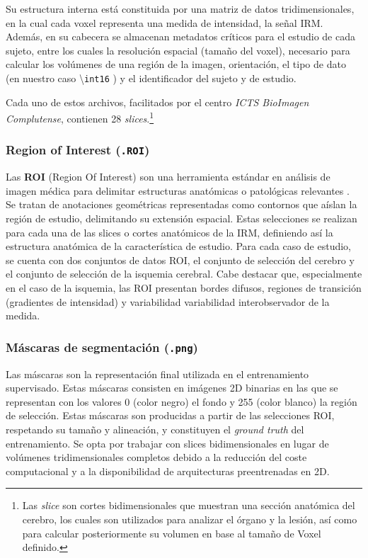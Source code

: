 Su estructura interna está constituida por una matriz de datos tridimensionales, en la cual cada voxel representa una medida de intensidad, la señal IRM. Además, en su cabecera se almacenan metadatos críticos para el estudio de cada sujeto, entre los cuales la resolución espacial (tamaño del voxel), necesario para calcular los volúmenes de una región de la imagen, orientación, el tipo de dato (en nuestro caso \textbackslash{\texttt{int16} )}
y el identificador del sujeto y de estudio.

Cada uno de estos archivos, facilitados por el centro \textit{ ICTS BioImagen Complutense}, contienen 28 \textit{slices}.\footnote{
Las \textit{slice} son cortes bidimensionales que muestran una sección anatómica del cerebro, los cuales son utilizados para analizar el órgano y la lesión, así como para calcular posteriormente su volumen en base al tamaño de Voxel definido.
}
\subsubsection{Region of Interest (\texttt{.ROI})}
Las \textbf{ROI} (Region Of Interest) son una herramienta estándar en análisis de imagen médica para delimitar estructuras anatómicas o patológicas relevantes \citep{nifti}.
Se tratan de anotaciones geométricas representadas como contornos que aíslan la región de estudio, delimitando su extensión espacial. Estas selecciones se realizan para cada una de las slices o cortes anatómicos de la IRM, definiendo así la estructura anatómica de la característica de estudio.
Para cada caso de estudio, se cuenta con dos conjuntos de datos ROI, el conjunto de selección del cerebro y el conjunto de selección de la isquemia cerebral.
Cabe destacar que, especialmente en el caso de la isquemia, las ROI presentan bordes difusos, regiones de transición (gradientes de intensidad) y variabilidad variabilidad interobservador de la medida.

\subsubsection{Máscaras de segmentación (\texttt{.png})}
Las máscaras son la representación final utilizada en el entrenamiento supervisado. 
Estas máscaras consisten en imágenes 2D binarias en las que se representan con los valores 0 (color negro) el fondo y 255 (color blanco) la región de selección.
Estas máscaras son producidas a partir de las selecciones ROI, respetando su tamaño y alineación, y constituyen el \textit{ground truth} del entrenamiento.
Se opta por trabajar con slices bidimensionales en lugar de volúmenes tridimensionales completos debido a la reducción del coste computacional y a la disponibilidad de arquitecturas preentrenadas en 2D.

